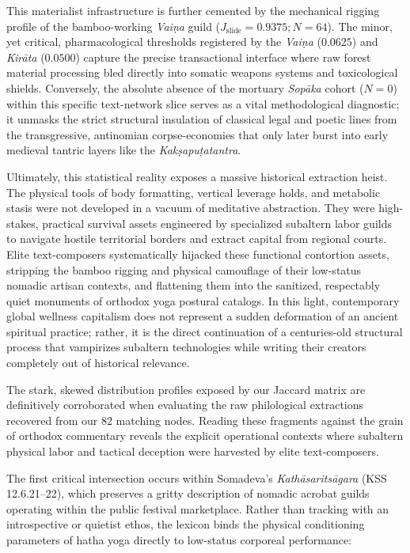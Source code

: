 \documentclass[11pt,twoside,letterpaper]{article}
\begin{document}
This materialist infrastructure is further cemented by the mechanical rigging profile of the bamboo-working \textit{Vai\d{n}a} guild ($J_{\text{slide}} = 0.9375; N = 64$). The minor, yet critical, pharmacological thresholds registered by the \textit{Vai\d{n}a} ($0.0625$) and \textit{Kir\={a}ta} ($0.0500$) capture the precise transactional interface where raw forest material processing bled directly into somatic weapons systems and toxicological shields. Conversely, the absolute absence of the mortuary \textit{Sop\={a}ka} cohort ($N = 0$) within this specific text-network slice serves as a vital methodological diagnostic; it unmasks the strict structural insulation of classical legal and poetic lines from the transgressive, antinomian corpse-economies that only later burst into early medieval tantric layers like the \textit{Kak\d{s}apu\d{t}atantra}.

Ultimately, this statistical reality exposes a massive historical extraction heist. The physical tools of body formatting, vertical leverage holds, and metabolic stasis were not developed in a vacuum of meditative abstraction. They were high-stakes, practical survival assets engineered by specialized subaltern labor guilds to navigate hostile territorial borders and extract capital from regional courts. Elite text-composers systematically hijacked these functional contortion assets, stripping the bamboo rigging and physical camouflage of their low-status nomadic artisan contexts, and flattening them into the sanitized, respectably quiet monuments of orthodox yoga postural catalogs. In this light, contemporary global wellness capitalism does not represent a sudden deformation of an ancient spiritual practice; rather, it is the direct continuation of a centuries-old structural process that vampirizes subaltern technologies while writing their creators completely out of historical relevance.

The stark, skewed distribution profiles exposed by our Jaccard matrix are definitively corroborated when evaluating the raw philological extractions recovered from our 82 matching nodes. Reading these fragments against the grain of orthodox commentary reveals the explicit operational contexts where subaltern physical labor and tactical deception were harvested by elite text-composers. 

The first critical intersection occurs within Somadeva's \textit{Kath\={a}sarits\={a}gara} (KSS 12.6.21–22), which preserves a gritty description of nomadic acrobat guilds operating within the public festival marketplace. Rather than tracking with an introspective or quietist ethos, the lexicon binds the physical conditioning parameters of hatha yoga directly to low-status corporeal performance:
\end{document}
